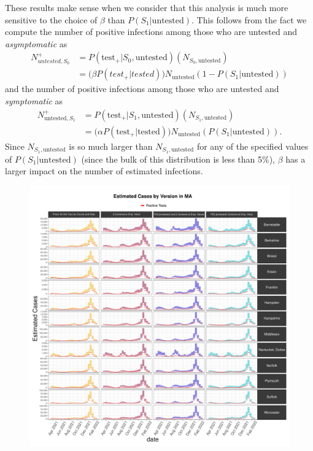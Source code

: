 \documentclass[12pt,twoside]{smiththesis}
\begin{document}
These results make sense when we consider that this analysis is much more sensitive to the choice of \(\beta\) than \(P(S_1|\text{untested})\). This follows from the fact we compute the number of positive infections among those who are untested and \emph{asymptomatic} as
\begin{align*}
N^+_{untested,S_0} &= P(\text{test}_+| S_0,\text{untested}) (N_{S_0,\text{untested}})\\
&= \Big( \beta P(test_+ |tested) \Big) N_{\text{untested}} (1-P(S_1|\text{untested}))
\end{align*}
and the number of positive infections among those who are untested and \emph{symptomatic} as\\
\begin{align*} N^+_{\text{untested},S_1}& = P(\text{test}_+| S_1,\text{untested}) (N_{S_1,\text{untested}})\\
&= \Big( \alpha P(\text{test}_+ |\text{tested}) \Big) N_{\text{untested}} (P(S_1|\text{untested})).
\end{align*}
Since \(N_{S_1, \text{untested}}\) is so much larger than \(N_{S_1, \text{untested}}\) for any of the specified values of \(P(S_1|\text{untested})\) (since the bulk of this distribution is less than 5\%), \(\beta\) has a larger impact on the number of estimated infections.
\begin{figure}
\includegraphics[width=0.95\linewidth]{figure/ma_pb_compared_to_observed} \caption{\label{fig:pb_counts_ma}}\label{fig:unnamed-chunk-11}
\end{figure}
\end{document}
